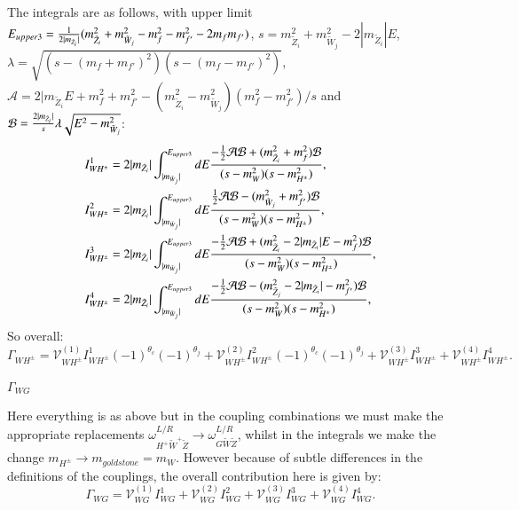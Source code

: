 \documentclass[final,3p,times]{elsarticle}
\begin{document}
The integrals are as follows, with upper limit $E_{upper3} = {1 \over 2 |m_{\tilde{Z}_i}|} (m_{\tilde{Z}_i}^2 + m_{\tilde{W}_j}^2 - m_{f}^2 - m_{f'}^2 - 2m_{f}m_{f'})$, $s = m_{\tilde{Z}_i}^2 + m_{\tilde{W}_j}^2 - 2|m_{\tilde{Z}_i}|E$, $\lambda = \sqrt{(s-(m_{f} + m_{f'})^2)(s-(m_{f}-m_{f'})^2)}$, $\mathcal{A} = 2|m_{\tilde{Z}_i}E + m_{f}^2 + m_{f'}^2 - (m_{\tilde{Z}_i}^2 - m_{\tilde{W}_j}^2)(m_{f}^2-m_{f'}^2)/s$ and $\mathcal{B} = {2|m_{\tilde{Z}_i}| \over s} \lambda \sqrt{E^2 - m_{\tilde{W}_j}^2} $:
\begin{align}
I_{W H^{\pm}}^{1} &= 2|m_{\tilde{Z}_i}| \int_{|m_{\tilde{W}_j}|}^{E_{upper3}} dE {-\frac{1}{2}\mathcal{A}\mathcal{B} + (m_{\tilde{Z}_i}^2 + m_{f}^2)\mathcal{B} \over (s-m_{W}^2)(s-m_{H^{\pm}}^2)}, \\
I_{W H^{\pm}}^{2} &= 2|m_{\tilde{Z}_i}| \int_{|m_{\tilde{W}_j}|}^{E_{upper3}} dE {\frac{1}{2}\mathcal{A}\mathcal{B} - (m_{\tilde{W}_j}^2 + m_{f'}^2)\mathcal{B} \over (s-m_{W}^2)(s-m_{H^{\pm}}^2)}, \\
I_{W H^{\pm}}^{3} &= 2|m_{\tilde{Z}_i}| \int_{|m_{\tilde{W}_j}|}^{E_{upper3}} dE {-\frac{1}{2}\mathcal{A}\mathcal{B} + (m_{\tilde{Z}_i}^2 -2|m_{\tilde{Z}_i}|E	 - m_{f}^2)\mathcal{B} \over (s-m_{W}^2)(s-m_{H^{\pm}}^2)}, \\
I_{W H^{\pm}}^{4} &= 2|m_{\tilde{Z}_i}| \int_{|m_{\tilde{W}_j}|}^{E_{upper3}} dE {-\frac{1}{2}\mathcal{A}\mathcal{B} - (m_{\tilde{Z}_j}^2 -2|m_{\tilde{Z}_i}| - m_{f'}^2)\mathcal{B} \over (s-m_{W}^2)(s-m_{H^{\pm}}^2)},
\end{align}
So overall:
\begin{equation}
\Gamma_{W H^{\pm}} = \mathcal{V}_{W H^{\pm}}^{(1)} I_{W H^{\pm}}^{1}(-1)^{\theta_c}(-1)^{\theta_j} + \mathcal{V}_{W H^{\pm}}^{(2)} I_{W H^{\pm}}^{2}(-1)^{\theta_c}(-1)^{\theta_j} + \mathcal{V}_{W H^{\pm}}^{(3)} I_{W H^{\pm}}^{3} + \mathcal{V}_{W H^{\pm}}^{(4)} I_{W H^{\pm}}^{4}.
\end{equation}

\textbf{\underline{$\Gamma_{W G}$}}

Here everything is as above but in the coupling combinations we must make the appropriate replacements $\omega_{H^+ \tilde{W}^+ \tilde{Z}}^{L/R} \rightarrow \omega_{G \tilde{W} \tilde{Z}}^{L/R}$, whilst in the integrals we make the change $m_{H^{\pm}} \rightarrow m_{goldstone} = m_{W}$. However because of subtle differences in the definitions of the couplings, the overall contribution here is given by:
\begin{equation}
\Gamma_{W G} = \mathcal{V}_{W G}^{(1)} I_{W G}^{1} + \mathcal{V}_{W G}^{(2)} I_{W G}^{2} + \mathcal{V}_{W G}^{(3)} I_{W G}^{3} + \mathcal{V}_{W G}^{(4)} I_{W G}^{4}.
\end{equation}
\end{document}
